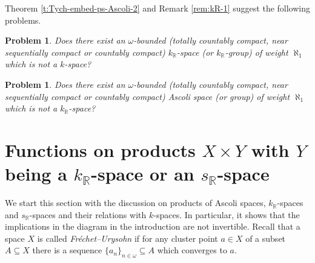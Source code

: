 \documentclass[preprint,11pt]{elsarticle}
\newtheorem{problem}[theorem]{Problem}
\numberwithin{equation}{section}
\numberwithin{theorem}{section}
\newcommand{\w}{\omega}
\newcommand{\IR}{\mathbb{R}}
\begin{document}
Theorem \ref{t:Tych-embed-ps-Ascoli-2} and Remark \ref{rem:kR-1} suggest the following problems.
\begin{problem}
Does there exist an $\w$-bounded (totally countably compact, near sequentially compact or countably compact) $k_\IR$-space (or $k_\IR$-group) of weight $\aleph_1$ which is not a $k$-space?
\end{problem}

\begin{problem}
Does there exist an $\w$-bounded (totally countably compact, near sequentially compact or countably compact) Ascoli space (or group) of weight $\aleph_1$ which is not a $k_\IR$-space?
\end{problem}





\section{Functions on products $X \times Y$ with $Y$ being a $k_\IR$-space or an $s_\IR$-space} \label{sec:products-kR-sR}



We start this section with the discussion on products of Ascoli spaces, $k_\IR$-spaces and $s_\IR$-spaces and their relations with $k$-spaces. In particular, it shows that the implications in the diagram in the introduction are not invertible. Recall that a space $X$ is called {\em Fr\'{e}chet--Urysohn} if for any cluster point $a\in X$ of a subset $A\subseteq X$ there is a sequence $\{ a_n\}_{n\in\w}\subseteq A$ which converges to $a$.
\end{document}
